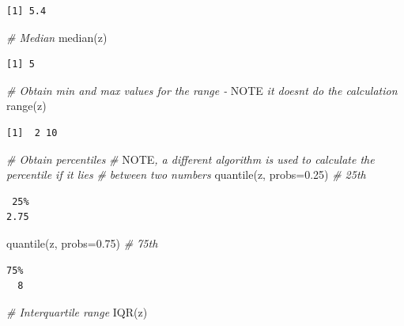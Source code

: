 \documentclass[
  oneside]{krantz}
\newenvironment{Shaded}{\begin{snugshade}}{\end{snugshade}}
\newcommand{\AlertTok}[1]{\textcolor[rgb]{0.94,0.16,0.16}{#1}}
\newcommand{\AttributeTok}[1]{\textcolor[rgb]{0.77,0.63,0.00}{#1}}
\newcommand{\CommentTok}[1]{\textcolor[rgb]{0.56,0.35,0.01}{\textit{#1}}}
\newcommand{\FloatTok}[1]{\textcolor[rgb]{0.00,0.00,0.81}{#1}}
\newcommand{\FunctionTok}[1]{\textcolor[rgb]{0.00,0.00,0.00}{#1}}
\newcommand{\NormalTok}[1]{#1}
\begin{document}
\begin{verbatim}
[1] 5.4
\end{verbatim}

\begin{Shaded}
\begin{Highlighting}[]
\CommentTok{\# Median}
\FunctionTok{median}\NormalTok{(z)}
\end{Highlighting}
\end{Shaded}

\begin{verbatim}
[1] 5
\end{verbatim}

\begin{Shaded}
\begin{Highlighting}[]
\CommentTok{\# Obtain min and max values for the range {-} }\AlertTok{NOTE}\CommentTok{ it doesn\textquotesingle{}t do the calculation}
\FunctionTok{range}\NormalTok{(z)}
\end{Highlighting}
\end{Shaded}

\begin{verbatim}
[1]  2 10
\end{verbatim}

\begin{Shaded}
\begin{Highlighting}[]
\CommentTok{\# Obtain percentiles}
\CommentTok{\# }\AlertTok{NOTE}\CommentTok{, a different algorithm is used to calculate the percentile if it lies}
\CommentTok{\#       between two numbers}
\FunctionTok{quantile}\NormalTok{(z, }\AttributeTok{probs=}\FloatTok{0.25}\NormalTok{) }\CommentTok{\# 25th }
\end{Highlighting}
\end{Shaded}

\begin{verbatim}
 25% 
2.75 
\end{verbatim}

\begin{Shaded}
\begin{Highlighting}[]
\FunctionTok{quantile}\NormalTok{(z, }\AttributeTok{probs=}\FloatTok{0.75}\NormalTok{) }\CommentTok{\# 75th}
\end{Highlighting}
\end{Shaded}

\begin{verbatim}
75% 
  8 
\end{verbatim}

\begin{Shaded}
\begin{Highlighting}[]
\CommentTok{\# Interquartile range}
\FunctionTok{IQR}\NormalTok{(z)}
\end{Highlighting}
\end{Shaded}
\end{document}
